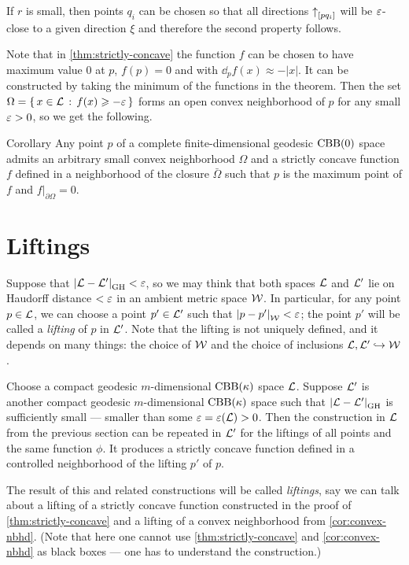 If $r$ is small, then points $q_i$ can be chosen so that all directions
${\uparrow}_{[{p}{q_i}]}$ will be $\varepsilon$-close to a given direction $\xi$ and
therefore the second property follows.
\qeds

Note that in \ref{thm:strictly-concave} the function $f$ can be chosen to have maximum value $0$ at $p$,
$f(p)=0$ and with $\dd_p f(x)\approx-|x|$.
It can be constructed by taking the minimum of the functions in the theorem.
Then the set $\Omega=\left\{\,{x\in\mathcal{L}}\,:\,{f(x)\geqslant -\varepsilon}\,\right\}$ forms an open convex neighborhood of $p$ for any small $\varepsilon>0$, so we get the following.


\begin{thm}{Corollary}\label{cor:convex-nbhd}
Any point $p$ of a complete finite-dimensional geodesic $\mathrm{CBB}(0)$ space admits an arbitrary small convex neighborhood $\Omega$ and a strictly concave function $f$ defined in a neighborhood of the closure $\bar\Omega$ such that $p$ is the maximum point of $f$
and $f|_{\partial\Omega}=0$.
\end{thm}

\section{Liftings}

Suppose that $\dist{\spc{L}}{\spc{L}'}{\GH}<\eps$, so we may think that both spaces $\mathcal{L}$ and $\mathcal{L}'$ lie on Haudorff distance $<\varepsilon$ in an ambient metric space $\mathcal{W}$.
In particular, for any point $p\in \mathcal{L}$, we can choose a point $p'\in \mathcal{L}'$ such that $\dist{p}{p'}{\spc{W}}<\eps$;
the point $p'$ will be called a \emph{lifting} of $p$ in $\mathcal{L}'$.
Note that the lifting is not uniquely defined, and it depends on many things: the choice of $\mathcal{W}$ and the choice of inclusions $\mathcal{L},\mathcal{L}'\hookrightarrow\mathcal{W}$.


Choose a compact geodesic $m$-dimensional $\mathrm{CBB}(\kappa)$ space $\mathcal{L}$.
Suppose $\mathcal{L}'$ is another compact geodesic $m$-dimensional $\mathrm{CBB}(\kappa)$ space such that $\dist{\spc{L}}{\spc{L}'}{\GH}$ is sufficiently small --- smaller than some $\varepsilon=\varepsilon(\mathcal{L})>0$.
Then the construction in $\mathcal{L}$ from the previous section  
can be repeated in $\mathcal{L}'$ for the liftings of all points and the same function $\phi$.
It produces a strictly concave function defined in a controlled neighborhood of the lifting $p'$ of $p$.

The result of this and related constructions will be called \emph{liftings},
say we can talk about a lifting of a strictly concave function constructed in the proof of \ref{thm:strictly-concave} and a lifting of a convex neighborhood from \ref{cor:convex-nbhd}.
(Note that here one cannot use \ref{thm:strictly-concave} and \ref{cor:convex-nbhd} as black boxes --- one has to understand the construction.)


